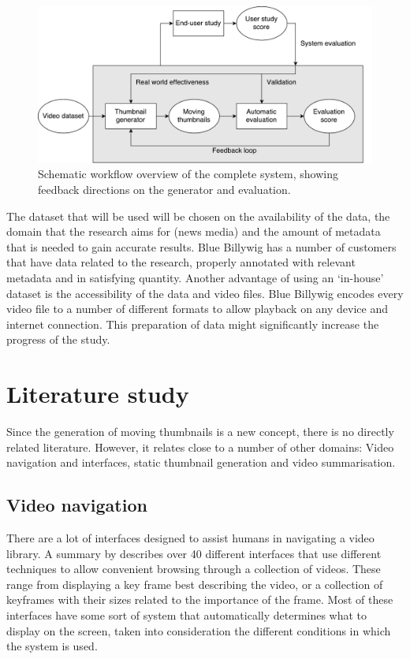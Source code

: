 \documentclass{../resources/acm_proc_article-sp}
\begin{document}
\begin{figure}[h]
  \label{fig:workflow}
  \includegraphics[width=\linewidth]{images/thesis-system.pdf}
  \caption{Schematic workflow overview of the complete system, showing feedback directions on the generator and evaluation.}
\end{figure}

The dataset that will be used will be chosen on the availability of the data, the domain that the research aims for (news media) and the amount of metadata that is needed to gain accurate results. Blue Billywig has a number of customers that have data related to the research, properly annotated with relevant metadata and in satisfying quantity. Another advantage of using an `in-house' dataset is the accessibility of the data and video files. Blue Billywig encodes every video file to a number of different formats to allow playback on any device and internet connection. This preparation of data might significantly increase the progress of the study.

\section{Literature study}

Since the generation of moving thumbnails is a new concept, there is no directly related literature. However, it relates close to a number of other domains: Video navigation and interfaces, static thumbnail generation and video summarisation.

\subsection{Video navigation}

There are a lot of interfaces designed to assist humans in navigating a video library. A summary by \textcite{Schoeffmann:2010iw} describes over 40 different interfaces that use different techniques to allow convenient browsing through a collection of videos. These range from displaying a key frame best describing the video, or a collection of keyframes with their sizes related to the importance of the frame. Most of these interfaces have some sort of system that automatically determines what to display on the screen, taken into consideration the different conditions in which the system is used.
\end{document}

